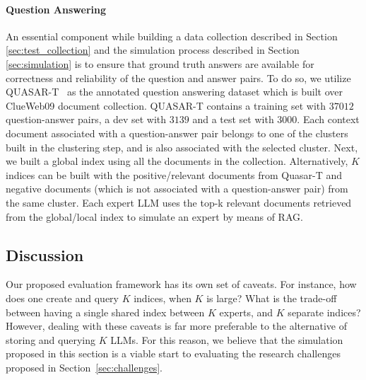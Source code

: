 \paragraph{Question Answering} An essential component while building a data collection described in Section \ref{sec:test_collection} and the simulation process described in Section \ref{sec:simulation} is to ensure that ground truth answers are available for correctness and reliability of the question and answer pairs. To do so, we utilize QUASAR-T~\cite{dhingra2017quasardatasetsquestionanswering} as the annotated question answering dataset which is built over ClueWeb09 document collection. QUASAR-T contains a training set with $37012$ question-answer pairs, a dev set with $3139$ and a test set with $3000$. Each context document associated with a question-answer pair belongs to one of the clusters built in the clustering step, and is also associated with the selected cluster. Next, we built a global index using all the documents in the collection. Alternatively, $K$ indices can be built with the positive/relevant documents from Quasar-T and negative documents (which is not associated with a question-answer pair) from the same cluster. Each expert LLM uses the top-k relevant documents retrieved from the global/local index to simulate an expert by means of RAG.

\subsection{Discussion}

Our proposed evaluation framework has its own set of caveats. For instance, how does one create and query $K$ indices, when $K$ is large? What is the trade-off between having a single shared index between $K$ experts, and $K$ separate indices? However, dealing with these caveats is far more preferable to the alternative of storing and querying $K$ LLMs. For this reason, we believe that the simulation proposed in this section is a viable start to evaluating the research challenges proposed in Section~\ref{sec:challenges}.
